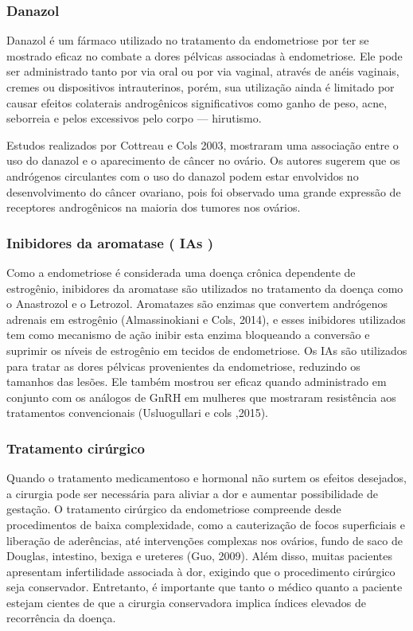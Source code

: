 \documentclass[12pt]{article} %
\begin{document}
\subsubsection{Danazol}

Danazol é um fármaco utilizado no tratamento da endometriose por ter
se mostrado eficaz no combate a dores pélvicas associadas à
endometriose. Ele pode ser administrado tanto por via oral ou por via
vaginal, através de anéis vaginais, cremes ou dispositivos
intrauterinos, porém, sua utilização ainda é limitado por causar
efeitos colaterais androgênicos significativos como ganho de peso,
acne, seborreia e pelos excessivos pelo corpo --- hirutismo.

Estudos realizados por Cottreau e Cols 2003, mostraram uma associação
entre o uso do danazol e o aparecimento de câncer no ovário. Os
autores sugerem que os andrógenos circulantes com o uso do danazol
podem estar envolvidos no desenvolvimento do câncer ovariano, pois foi
observado uma grande expressão de receptores androgênicos na maioria
dos tumores nos ovários.

\subsubsection{Inibidores da aromatase ( IAs )}

Como a endometriose é considerada uma doença crônica dependente de
estrogênio, inibidores da aromatase são utilizados no tratamento da
doença como o Anastrozol e o Letrozol. Aromatazes são enzimas que
convertem andrógenos adrenais em estrogênio (Almassinokiani e Cols,
2014), e esses inibidores utilizados tem como mecanismo de ação inibir
esta enzima bloqueando a conversão e suprimir os níveis de estrogênio
em tecidos de endometriose. Os IAs são utilizados para tratar as dores
pélvicas provenientes da endometriose, reduzindo os tamanhos das
lesões. Ele também mostrou ser eficaz quando administrado em conjunto
com os análogos de GnRH em mulheres que mostraram resistência aos
tratamentos convencionais (Usluogullari e cols ,2015).


\subsubsection{Tratamento cirúrgico}

Quando o tratamento medicamentoso e hormonal não surtem os efeitos
desejados, a cirurgia pode ser necessária para aliviar a dor e
aumentar possibilidade de gestação.  O tratamento cirúrgico da
endometriose compreende desde procedimentos de baixa complexidade,
como a cauterização de focos superficiais e liberação de aderências, até
intervenções complexas nos ovários, fundo de saco de Douglas,
intestino, bexiga e ureteres (Guo, 2009). Além disso, muitas pacientes
apresentam infertilidade associada à dor, exigindo que o procedimento
cirúrgico seja conservador. Entretanto, é importante que tanto o
médico quanto a paciente estejam cientes de que a cirurgia
conservadora implica índices elevados de recorrência da doença. %
\end{document}
